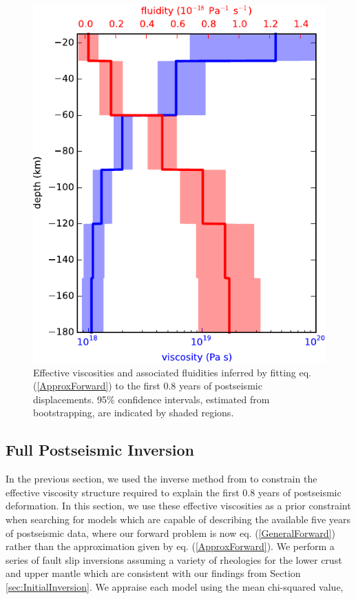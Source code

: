 \documentclass[draft,linenumbers]{AGUJournal}
\begin{document}
\begin{figure}
\includegraphics[scale=0.9]{Figures/2016jb013114-p12}
\centering 
\caption{Effective viscosities and associated fluidities inferred by fitting eq. (\ref{ApproxForward}) to the first 0.8 years of postseismic displacements. 95\% confidence intervals, estimated from bootstrapping, are indicated by shaded regions.}
\label{fig:EffectiveViscosity}
\end{figure} 

\subsection{Full Postseismic Inversion}\label{sec:FullInversion} 
In the previous section, we used the inverse method from \citet{Hines2016} to constrain the effective viscosity structure required to explain the first 0.8 years of postseismic deformation. In this section, we use these effective viscosities as a prior constraint when searching for models which are capable of describing the available five years of postseismic data, where our forward problem is now eq. (\ref{GeneralForward}) rather than the approximation given by eq. (\ref{ApproxForward}).  We perform a series of fault slip inversions assuming a variety of rheologies for the lower crust and upper mantle which are consistent with our findings from Section \ref{sec:InitialInversion}.  We appraise each model using the mean chi-squared value,
\end{document}

